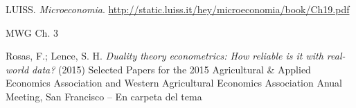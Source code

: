 \documentclass{nuevotema}
\begin{document}
LUISS. \textit{Microeconomia}. \url{http://static.luiss.it/hey/microeconomia/book/Ch19.pdf}

MWG Ch. 3

Rosas, F.; Lence, S. H. \textit{Duality theory econometrics: How reliable is it with real-world data?} (2015) Selected Papers for the 2015 Agricultural \& Applied Economics Association and Western Agricultural Economics Association Anual Meeting, San Francisco -- En carpeta del tema
\end{document}
